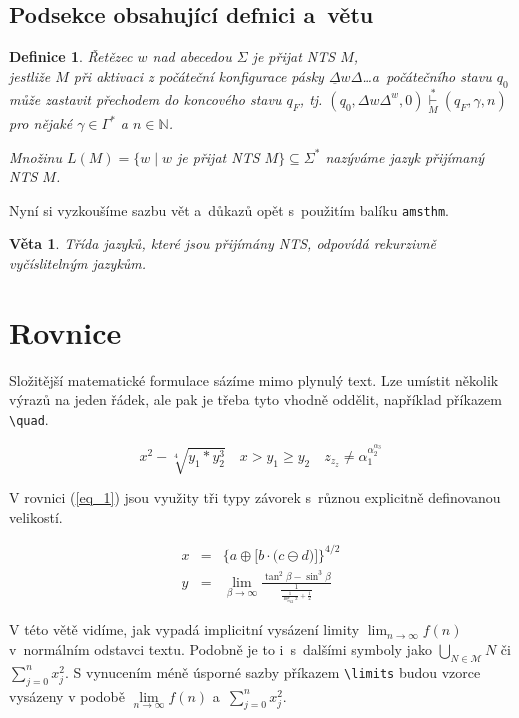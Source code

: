 \documentclass[a4paper, 11pt, twocolumn]{article}
\newtheorem{definition}{Definice}
\newtheorem{sentence}{Věta}
\begin{document}
        \subsection{Podsekce obsahující defnici a~větu}
        \begin{definition}
        \label{def2}
        \emph{Řetězec $ w $ nad abecedou $ \Sigma $ je přijat NTS $ M $,}\\ jestliže $ M $ při aktivaci z počáteční konfigurace pásky $ \underline{\Delta}w\Delta $\dots a~počátečního stavu $ q_0 $ může zastavit přechodem do koncového stavu $ q_F $, tj. $ (q_0,\Delta w\Delta^w,0) \overset{*}{\underset{M}{\vdash}} (q_F,\gamma,n)$  pro nějaké $ \gamma \in \Gamma^* $ a $ n \in \mathbb{N} $.
        
        Množinu $ L(M) = \{w \mid w $ je přijat NTS $ M\} \subseteq \Sigma^* $ nazýváme \emph{jazyk přijímaný NTS} $ M $.
        \end{definition}
        Nyní si vyzkoušíme sazbu vět a~důkazů opět s~použitím balíku \texttt{amsthm}.
        \begin{sentence}
        Třída jazyků, které jsou přijímány NTS, odpovídá \emph{rekurzivně vyčíslitelným jazykům.}
        \end{sentence}
    \section{Rovnice}
        Složitější matematické formulace sázíme mimo plynulý text. Lze umístit několik výrazů na jeden řádek, ale pak je třeba tyto vhodně oddělit, například příkazem \verb|\quad|.
        
        $$
        x^2 - \sqrt[4]{y_1*y^3_2}
        \quad
        x > y_1 \geq y_2
        \quad
        z_{z_z}\neq \alpha_1^{\alpha_2^{\alpha_3}}
        $$
        
        V rovnici (\ref{eq_1}) jsou využity tři typy závorek s~různou explicitně definovanou velikostí.
        
        \begin{eqnarray}
        \label{eq_1} x & = & \bigg\{a \oplus\Big[b \cdot\big(c\ominus d\big)\Big]\bigg\}^{4/2}\\
        \label{eq_2} y & = & \lim_{\beta\to\infty} \frac{\tan^2\beta - \sin^3\beta}{\frac{1}{\frac{1}{\log_{42}{x}}+\frac{1}{2}}}
        \end{eqnarray}
        
        V této větě vidíme, jak vypadá implicitní vysázení limity $ \lim_{n\to\infty} f(n) $ v~normálním odstavci textu. Podobně je to i~s~dalšími symboly jako $ \bigcup_{N \in \mathcal{M}} N $ či $ \sum^n_{j=0}x^2_j $.
        S vynucením méně úsporné sazby příkazem \verb|\limits| budou vzorce vysázeny v podobě $ \lim\limits_{n\to\infty} f(n)$ a~$\sum\limits_{j=0}^{n}x^2_j $.
        
\end{document}
